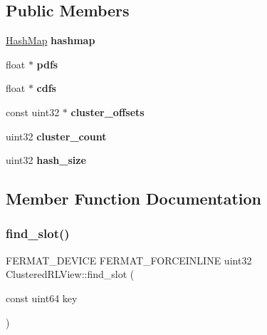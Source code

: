 \subsection*{Public Members}
\begin{DoxyCompactItemize}
\item 
\mbox{\label{struct_clustered_r_l_view_af017028074f59ea52f3b1b67ffe42cd9}} 
\hyperlink{structcugar_1_1cuda_1_1_sync_free_hash_map}{Hash\+Map} {\bfseries hashmap}
\item 
\mbox{\label{struct_clustered_r_l_view_abd81e6d4f9872bb2a0e8d39c9c556d07}} 
float $\ast$ {\bfseries pdfs}
\item 
\mbox{\label{struct_clustered_r_l_view_af7e919362e6c7bb1abf565f0de4086b7}} 
float $\ast$ {\bfseries cdfs}
\item 
\mbox{\label{struct_clustered_r_l_view_af65cac683664066fbf4a11f2ebdc85b5}} 
const uint32 $\ast$ {\bfseries cluster\+\_\+offsets}
\item 
\mbox{\label{struct_clustered_r_l_view_afdd21a456172be84e79373771a4501e3}} 
uint32 {\bfseries cluster\+\_\+count}
\item 
\mbox{\label{struct_clustered_r_l_view_abf5bfb1437690f7099f91ef3ae35890e}} 
uint32 {\bfseries hash\+\_\+size}
\end{DoxyCompactItemize}


\subsection{Member Function Documentation}
\mbox{\label{struct_clustered_r_l_view_ad23add8b87f5755240e40d976f9c8b0d}} 
\subsubsection{\texorpdfstring{find\+\_\+slot()}{find\_slot()}}
{\footnotesize\ttfamily F\+E\+R\+M\+A\+T\+\_\+\+D\+E\+V\+I\+CE F\+E\+R\+M\+A\+T\+\_\+\+F\+O\+R\+C\+E\+I\+N\+L\+I\+NE uint32 Clustered\+R\+L\+View\+::find\+\_\+slot (\begin{DoxyParamCaption}\item[{const uint64}]{key }\end{DoxyParamCaption})}

